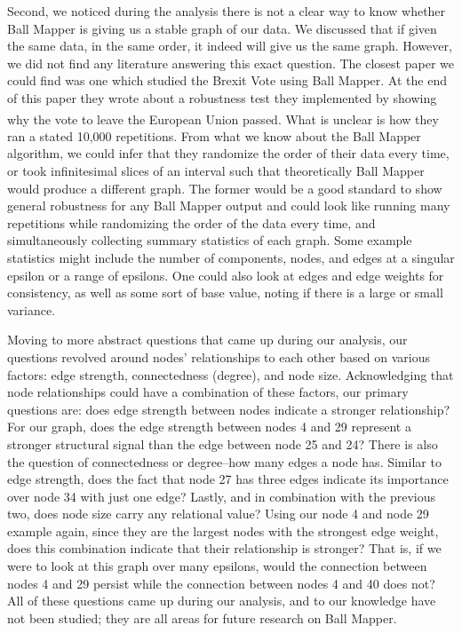 \documentclass[
  10pt,
  letterpaper,
  DIV=11,
  numbers=noendperiod]{scrartcl}
\begin{document}
Second, we noticed during the analysis there is not a clear way to know
whether Ball Mapper is giving us a stable graph of our data. We
discussed that if given the same data, in the same order, it indeed will
give us the same graph. However, we did not find any literature
answering this exact question. The closest paper we could find was one
which studied the Brexit Vote using Ball Mapper. At the end of this
paper they wrote about a robustness test they implemented by showing why
the vote to leave the European Union
passed.\textsuperscript{}
What is unclear is how they ran a stated 10,000 repetitions. From what
we know about the Ball Mapper algorithm, we could infer that they
randomize the order of their data every time, or took infinitesimal
slices of an interval such that theoretically Ball Mapper would produce
a different graph. The former would be a good standard to show general
robustness for any Ball Mapper output and could look like running many
repetitions while randomizing the order of the data every time, and
simultaneously collecting summary statistics of each graph. Some example
statistics might include the number of components, nodes, and edges at a
singular epsilon or a range of epsilons. One could also look at edges
and edge weights for consistency, as well as some sort of base value,
noting if there is a large or small variance.

Moving to more abstract questions that came up during our analysis, our
questions revolved around nodes' relationships to each other based on
various factors: edge strength, connectedness (degree), and node size.
Acknowledging that node relationships could have a combination of these
factors, our primary questions are: does edge strength between nodes
indicate a stronger relationship? For our graph, does the edge strength
between nodes 4 and 29 represent a stronger structural signal than the
edge between node 25 and 24? There is also the question of connectedness
or degree--how many edges a node has. Similar to edge strength, does the
fact that node 27 has three edges indicate its importance over node 34
with just one edge? Lastly, and in combination with the previous two,
does node size carry any relational value? Using our node 4 and node 29
example again, since they are the largest nodes with the strongest edge
weight, does this combination indicate that their relationship is
stronger? That is, if we were to look at this graph over many epsilons,
would the connection between nodes 4 and 29 persist while the connection
between nodes 4 and 40 does not? All of these questions came up during
our analysis, and to our knowledge have not been studied; they are all
areas for future research on Ball Mapper.
\end{document}
